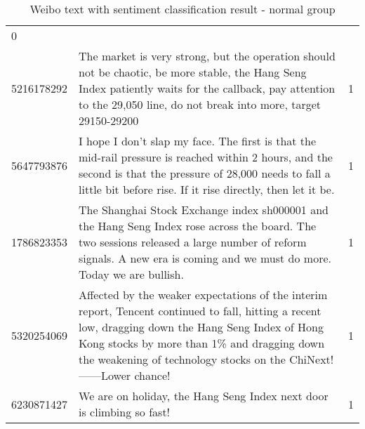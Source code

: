 \begin{table}[htbp]
\begin{tabular}{lll}
  0 \\
5216178292 &
  The market is very strong, but the operation should not be chaotic, be more stable, the Hang Seng Index patiently waits for the callback, pay attention to the 29,050 line, do not break into more, target 29150-29200 &
  1 \\
5647793876 &
  I hope I don’t slap my face. The first is that the mid-rail pressure is reached within 2 hours, and the second is that the pressure of 28,000 needs to fall a little bit before rise. If it rise directly, then let it be. &
  1 \\
1786823353 &
  The Shanghai Stock Exchange index sh000001 and the Hang Seng Index rose across the board. The two sessions released a large number of reform signals. A new era is coming and we must do more. Today we are bullish. &
  1 \\
5320254069 &
  Affected by the weaker expectations of the interim report, Tencent continued to fall, hitting a recent low, dragging down the Hang Seng Index of Hong Kong stocks by more than 1\% and dragging down the weakening of technology stocks on the ChiNext!  ------Lower chance! &
  1 \\
6230871427 &
  We are on holiday, the Hang Seng Index next door is climbing so fast! &
  1 \\
\end{tabular}
\caption{Weibo text with sentiment classification result - normal group}
\label{tab:classified-weibo-text-normal }
\end{table}

